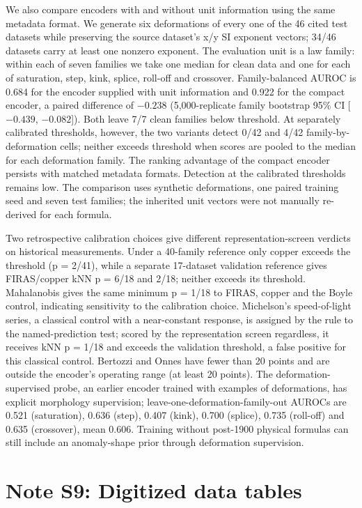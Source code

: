 \documentclass{article}
\begin{document}
We also compare encoders with and without unit information using the same metadata format. We generate six deformations of every one of the 46 cited test datasets while preserving the source dataset's x/y SI exponent vectors; 34/46 datasets carry at least one nonzero exponent. The evaluation unit is a law family: within each of seven families we take one median for clean data and one for each of saturation, step, kink, splice, roll-off and crossover. Family-balanced AUROC is 0.684 for the encoder supplied with unit information and 0.922 for the compact encoder, a paired difference of $-0.238$ (5,000-replicate family bootstrap 95\% CI [$-0.439$, $-0.082$]). Both leave 7/7 clean families below threshold. At separately calibrated thresholds, however, the two variants detect 0/42 and 4/42 family-by-deformation cells; neither exceeds threshold when scores are pooled to the median for each deformation family. The ranking advantage of the compact encoder persists with matched metadata formats. Detection at the calibrated thresholds remains low. The comparison uses synthetic deformations, one paired training seed and seven test families; the inherited unit vectors were not manually re-derived for each formula.

Two retrospective calibration choices give different representation-screen verdicts on historical measurements. Under a 40-family reference only copper exceeds the threshold (p = 2/41), while a separate 17-dataset validation reference gives FIRAS/copper kNN p = 6/18 and 2/18; neither exceeds its threshold. Mahalanobis gives the same minimum p = 1/18 to FIRAS, copper and the Boyle control, indicating sensitivity to the calibration choice. Michelson's speed-of-light series, a classical control with a near-constant response, is assigned by the rule to the named-prediction test; scored by the representation screen regardless, it receives kNN p = 1/18 and exceeds the validation threshold, a false positive for this classical control. Bertozzi and Onnes have fewer than 20 points and are outside the encoder's operating range (at least 20 points). The deformation-supervised probe, an earlier encoder trained with examples of deformations, has explicit morphology supervision; leave-one-deformation-family-out AUROCs are 0.521 (saturation), 0.636 (step), 0.407 (kink), 0.700 (splice), 0.735 (roll-off) and 0.635 (crossover), mean 0.606. Training without post-1900 physical formulas can still include an anomaly-shape prior through deformation supervision.

\section{Note S9: Digitized data tables}
\end{document}
